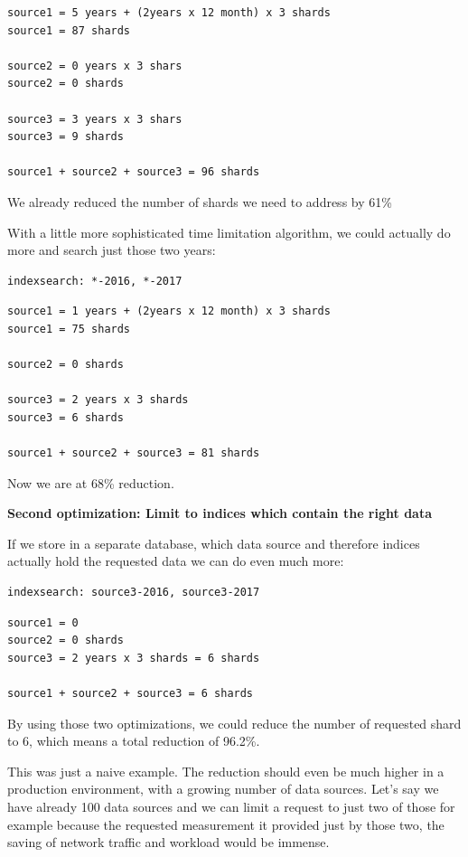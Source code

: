 \begin{verbatim}
source1 = 5 years + (2years x 12 month) x 3 shards
source1 = 87 shards

source2 = 0 years x 3 shars
source2 = 0 shards

source3 = 3 years x 3 shars
source3 = 9 shards

source1 + source2 + source3 = 96 shards
\end{verbatim}

We already reduced the number of shards we need to address by 61\%

With a little more sophisticated time limitation algorithm, we could
actually do more and search just those two years:

\begin{verbatim}
indexsearch: *-2016, *-2017
\end{verbatim}

\begin{verbatim}
source1 = 1 years + (2years x 12 month) x 3 shards
source1 = 75 shards

source2 = 0 shards

source3 = 2 years x 3 shards
source3 = 6 shards

source1 + source2 + source3 = 81 shards
\end{verbatim}

Now we are at 68\% reduction.

\textbf{Second optimization: Limit to indices which contain the right
data}

If we store in a separate database, which data source and therefore
indices actually hold the requested data we can do even much more:

\begin{verbatim}
indexsearch: source3-2016, source3-2017
\end{verbatim}

\begin{verbatim}
source1 = 0
source2 = 0 shards
source3 = 2 years x 3 shards = 6 shards

source1 + source2 + source3 = 6 shards
\end{verbatim}

By using those two optimizations, we could reduce the number of
requested shard to 6, which means a total reduction of 96.2\%.

This was just a naive example. The reduction should even be much higher
in a production environment, with a growing number of data sources.
Let's say we have already 100 data sources and we can limit a request to
just two of those for example because the requested measurement it
provided just by those two, the saving of network traffic and workload
would be immense.

